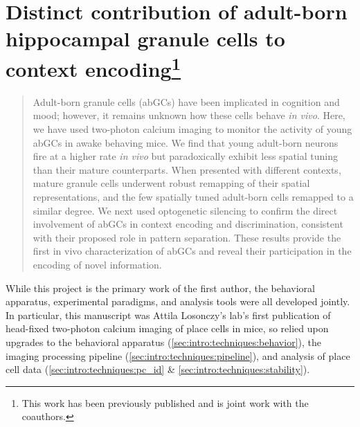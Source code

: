 \section[Distinct contribution of adult-born hippocampal granule cells to context encoding]{Distinct contribution of adult-born hippocampal granule cells to context encoding\footnote{This work has been previously published \citep{Danielson2016a} and is joint work with the coauthors.}}
\label{sec:other:DG}
\begin{quote}
Adult-born granule cells (abGCs) have been implicated in cognition and mood; however, it remains unknown how these cells behave \emph{in vivo}. Here, we have used two-photon calcium imaging to monitor the activity of young abGCs in awake behaving mice. We find that young adult-born neurons fire at a higher rate \emph{in vivo} but paradoxically exhibit less spatial tuning than their mature counterparts. When presented with different contexts, mature granule cells underwent robust remapping of their spatial representations, and the few spatially tuned adult-born cells remapped to a similar degree. We next used optogenetic silencing to confirm the direct involvement of abGCs in context encoding and discrimination, consistent with their proposed role in pattern separation. These results provide the first in vivo characterization of abGCs and reveal their participation in the encoding of novel information.
\end{quote}

While this project is the primary work of the first author, the behavioral apparatus, experimental paradigms, and analysis tools were all developed jointly.
In particular, this manuscript was Attila Losonczy's lab's first publication of head-fixed two-photon calcium imaging of place cells in mice, so relied upon upgrades to the behavioral apparatus (\autoref{sec:intro:techniques:behavior}), the imaging processing pipeline (\autoref{sec:intro:techniques:pipeline}), and analysis of place cell data (\autoref{sec:intro:techniques:pc_id} \& \autoref{sec:intro:techniques:stability}).

